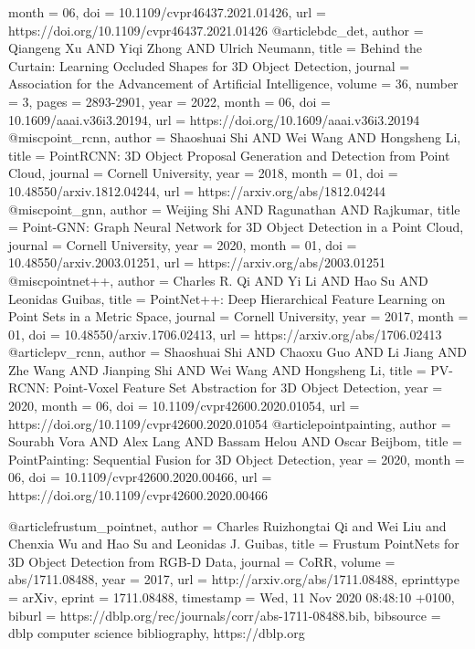 \begin{bibtex-entries}
{month = {06},
doi = {10.1109/cvpr46437.2021.01426},
url = {https://doi.org/10.1109/cvpr46437.2021.01426}
}
@article{bdc_det,
author = {Qiangeng Xu AND Yiqi Zhong AND Ulrich Neumann},
title = {Behind the Curtain: Learning Occluded Shapes for 3D Object Detection},
journal = {Association for the Advancement of Artificial Intelligence},
volume = {36},
number = {3},
pages = {2893-2901},
year = {2022},
month = {06},
doi = {10.1609/aaai.v36i3.20194},
url = {https://doi.org/10.1609/aaai.v36i3.20194}
}
@misc{point_rcnn,
author = {Shaoshuai Shi AND Wei Wang AND Hongsheng Li},
title = {PointRCNN: 3D Object Proposal Generation and Detection from Point Cloud},
journal = {Cornell University},
year = {2018},
month = {01},
doi = {10.48550/arxiv.1812.04244},
url = {https://arxiv.org/abs/1812.04244}
}
@misc{point_gnn,
author = {Weijing Shi AND  Ragunathan AND  Rajkumar},
title = {Point-GNN: Graph Neural Network for 3D Object Detection in a Point Cloud},
journal = {Cornell University},
year = {2020},
month = {01},
doi = {10.48550/arxiv.2003.01251},
url = {https://arxiv.org/abs/2003.01251}
}
@misc{pointnet++,
author = {Charles R. Qi AND Yi Li AND Hao Su AND Leonidas Guibas},
title = {PointNet++: Deep Hierarchical Feature Learning on Point Sets in a Metric Space},
journal = {Cornell University},
year = {2017},
month = {01},
doi = {10.48550/arxiv.1706.02413},
url = {https://arxiv.org/abs/1706.02413}
}
@article{pv_rcnn,
author = {Shaoshuai Shi AND Chaoxu Guo AND Li Jiang AND Zhe Wang AND Jianping Shi AND Wei Wang AND Hongsheng Li},
title = {PV-RCNN: Point-Voxel Feature Set Abstraction for 3D Object Detection},
year = {2020},
month = {06},
doi = {10.1109/cvpr42600.2020.01054},
url = {https://doi.org/10.1109/cvpr42600.2020.01054}
}
@article{pointpainting,
author = {Sourabh Vora AND Alex Lang AND Bassam Helou AND Oscar Beijbom},
title = {PointPainting: Sequential Fusion for 3D Object Detection},
year = {2020},
month = {06},
doi = {10.1109/cvpr42600.2020.00466},
url = {https://doi.org/10.1109/cvpr42600.2020.00466}
}

@article{frustum_pointnet,
  author       = {Charles Ruizhongtai Qi and
                  Wei Liu and
                  Chenxia Wu and
                  Hao Su and
                  Leonidas J. Guibas},
  title        = {Frustum PointNets for 3D Object Detection from {RGB-D} Data},
  journal      = {CoRR},
  volume       = {abs/1711.08488},
  year         = {2017},
  url          = {http://arxiv.org/abs/1711.08488},
  eprinttype    = {arXiv},
  eprint       = {1711.08488},
  timestamp    = {Wed, 11 Nov 2020 08:48:10 +0100},
  biburl       = {https://dblp.org/rec/journals/corr/abs-1711-08488.bib},
  bibsource    = {dblp computer science bibliography, https://dblp.org}
}


\end{bibtex-entries}
